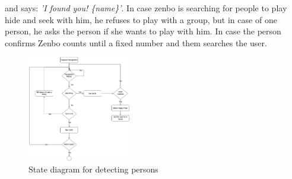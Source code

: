 \documentclass[conference]{IEEEtran}
\begin{document}
and says: \textit{'I found you! \{name\}'}. In case zenbo is searching for people to play hide and seek with him, he refuses to play with a group, but 
in case of one person, he asks the person if she wants to play with him. In case the person confirms Zenbo counts until a fixed number and them searches the user.
\begin{figure}[h]  \label{fig:computerVision}
	\begin{center}
		\includegraphics[width=0.4\textwidth]{pics/computerVisionFlow.png}
	\end{center}
	\caption{State diagram for detecting persons}
\end{figure}
\end{document}
